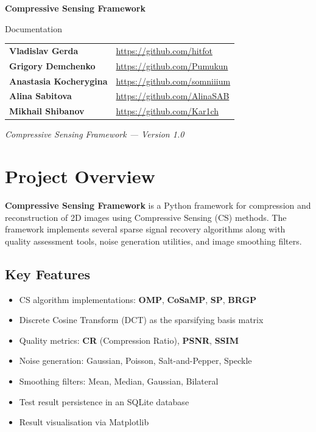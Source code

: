 \documentclass[12pt,a4paper]{article}
\begin{document}
\begin{titlepage}
  \centering
  \vspace*{3cm}
  {\huge\bfseries Compressive Sensing Framework\par}
  \vspace{0.8cm}
  {\Large Documentation\par}
  \vspace{2.5cm}
  \begin{tabular}{ll}
    \textbf{Vladislav Gerda}       & \url{https://github.com/hitfot}    \\
    \textbf{Grigory Demchenko}     & \url{https://github.com/Pumukun}   \\
    \textbf{Anastasia Kocherygina} & \url{https://github.com/somniiium} \\
    \textbf{Alina Sabitova}        & \url{https://github.com/AlinaSAB}  \\
    \textbf{Mikhail Shibanov}      & \url{https://github.com/Kar1ch}    \\
  \end{tabular}
  \vfill
  {\normalsize\itshape Compressive Sensing Framework --- Version 1.0\par}
\end{titlepage}

\tableofcontents
\newpage

\section{Project Overview}

\textbf{Compressive Sensing Framework} is a Python framework for compression
and reconstruction of 2D images using Compressive Sensing (CS) methods.  The
framework implements several sparse signal recovery algorithms along with
quality assessment tools, noise generation utilities, and image smoothing
filters.

\subsection{Key Features}

\begin{itemize}
  \item CS algorithm implementations: \textbf{OMP}, \textbf{CoSaMP},
        \textbf{SP}, \textbf{BRGP}
  \item Discrete Cosine Transform (DCT) as the sparsifying basis matrix
  \item Quality metrics: \textbf{CR} (Compression Ratio), \textbf{PSNR},
        \textbf{SSIM}
  \item Noise generation: Gaussian, Poisson, Salt-and-Pepper, Speckle
  \item Smoothing filters: Mean, Median, Gaussian, Bilateral
  \item Test result persistence in an SQLite database
  \item Result visualisation via Matplotlib
\end{itemize}
\end{document}
